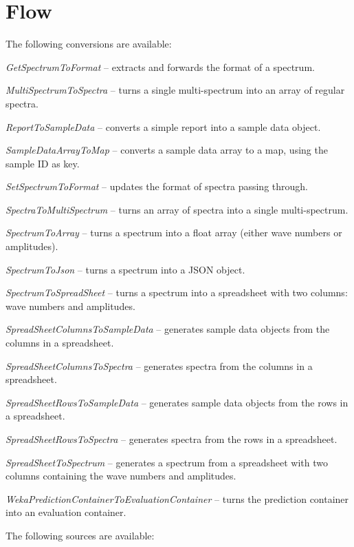 \documentclass[a4paper]{book}
\begin{document}
\chapter{Flow}
The following conversions are available:
\begin{tight_itemize}
  \item \textit{GetSpectrumToFormat} -- extracts and forwards the format of a spectrum.
  \item \textit{MultiSpectrumToSpectra} -- turns a single multi-spectrum
  into an array of regular spectra.
  \item \textit{ReportToSampleData} -- converts a simple report into
  a sample data object.
  \item \textit{SampleDataArrayToMap} -- converts a sample data array to a map, using the sample ID as key.
  \item \textit{SetSpectrumToFormat} -- updates the format of spectra passing through.
  \item \textit{SpectraToMultiSpectrum} -- turns an array of spectra
  into a single multi-spectrum.
  \item \textit{SpectrumToArray} -- turns a spectrum into a float array
  (either wave numbers or amplitudes).
  \item \textit{SpectrumToJson} -- turns a spectrum into a JSON object.
  \item \textit{SpectrumToSpreadSheet} -- turns a spectrum into a spreadsheet
  with two columns: wave numbers and amplitudes.
  \item \textit{SpreadSheetColumnsToSampleData} -- generates sample data objects from the columns in a spreadsheet.
  \item \textit{SpreadSheetColumnsToSpectra} -- generates spectra from the columns in a spreadsheet.
  \item \textit{SpreadSheetRowsToSampleData} -- generates sample data objects from the rows in a spreadsheet.
  \item \textit{SpreadSheetRowsToSpectra} -- generates spectra from the rows in a spreadsheet.
  \item \textit{SpreadSheetToSpectrum} -- generates a spectrum from a spreadsheet
  with two columns containing the wave numbers and amplitudes.
  \item \textit{WekaPredictionContainerToEvaluationContainer} -- turns the
  prediction container into an evaluation container.
\end{tight_itemize}
The following sources are available:
\end{document}

